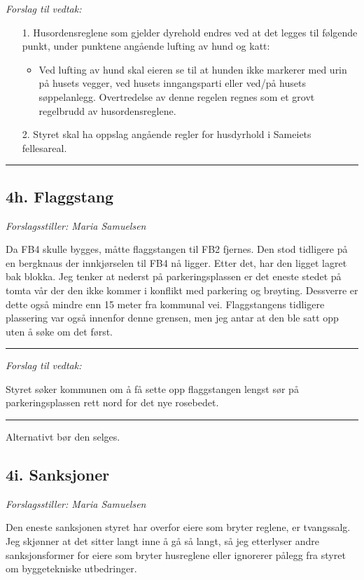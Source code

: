 \documentclass[12pt]{article}
\begin{document}
{\em Forslag til vedtak:}
\begin{enumerate}
\item[1.] Husordensreglene som gjelder dyrehold endres ved at det legges til følgende punkt, under punktene angående lufting av hund og katt:
\begin{itemize}
\item Ved lufting av hund skal eieren se til at hunden ikke markerer med urin på husets vegger, ved husets inngangsparti eller ved/på husets søppelanlegg. Overtredelse av denne regelen regnes som et grovt regelbrudd av husordensreglene.
\end{itemize}
\item[2.] Styret skal ha oppslag angående regler for husdyrhold i Sameiets fellesareal.
\end{enumerate}
{\rule{\textwidth}{0.3pt}}

\subsection*{4h. Flaggstang}

{\em Forslagsstiller: Maria Samuelsen}

Da FB4 skulle bygges, måtte flaggstangen til FB2 fjernes. Den stod tidligere på en bergknaus der
innkjørselen til FB4 nå ligger. Etter det, har den ligget lagret bak blokka. Jeg tenker at nederst på
parkeringsplassen er det eneste stedet på tomta vår der den ikke kommer i konflikt med parkering
og brøyting. Dessverre er dette også mindre enn 15 meter fra kommunal vei. Flaggstangens tidligere
plassering var også innenfor denne grensen, men jeg antar at den ble satt opp uten å søke om det
først.

{\rule{\textwidth}{0.3pt}}

{\em Forslag til vedtak:}

Styret søker kommunen om å få sette opp flaggstangen lengst sør på parkeringsplassen rett
nord for det nye rosebedet.\\
{\rule{\textwidth}{0.3pt}}

Alternativt bør den selges.

\subsection*{4i. Sanksjoner}

{\em Forslagsstiller: Maria Samuelsen}

Den eneste sanksjonen styret har overfor eiere som bryter reglene, er tvangssalg. Jeg skjønner at
det sitter langt inne å gå så langt, så jeg etterlyser andre sanksjonsformer for eiere som bryter
husreglene eller ignorerer pålegg fra styret om byggetekniske utbedringer.
\end{document}
